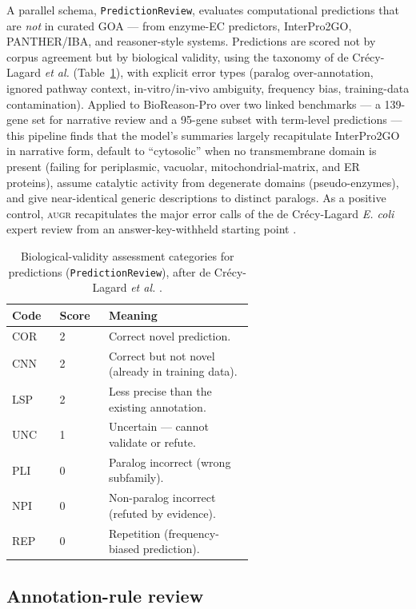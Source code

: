 \documentclass[11pt]{article}
\newcommand{\augr}{\textsc{augr}}
\newcommand{\code}[1]{\texttt{#1}}
\begin{document}
A parallel schema, \code{PredictionReview}, evaluates computational predictions
that are \emph{not} in curated GOA --- from enzyme-EC predictors, InterPro2GO,
PANTHER/IBA, and reasoner-style systems. Predictions are scored not by corpus
agreement but by biological validity, using the taxonomy of de Cr\'ecy-Lagard
\emph{et al.} \cite{decrecylagard2025} (Table~\ref{tab:pred}), with explicit error
types (paralog over-annotation, ignored pathway context, in-vitro/in-vivo
ambiguity, frequency bias, training-data contamination). Applied to BioReason-Pro
\cite{fallahpour2026} over two linked benchmarks --- a 139-gene set for narrative
review and a 95-gene subset with term-level predictions --- this pipeline finds
that the model's summaries largely recapitulate InterPro2GO in narrative form,
default to ``cytosolic'' when no transmembrane domain is present (failing for
periplasmic, vacuolar, mitochondrial-matrix, and ER proteins), assume catalytic
activity from degenerate domains (pseudo-enzymes), and give near-identical generic
descriptions to distinct paralogs. As a positive control, \augr{} recapitulates
the major error calls of the de Cr\'ecy-Lagard \emph{E. coli} expert review from
an answer-key-withheld starting point \cite{mungall2026esrecolidetmini}.

\begin{table}[htbp]
\centering
\caption{Biological-validity assessment categories for predictions
(\code{PredictionReview}), after de Cr\'ecy-Lagard \emph{et al.}
\cite{decrecylagard2025}.}
\label{tab:pred}
\small
\begin{tabular}{@{}llp{0.60\linewidth}@{}}
\toprule
\textbf{Code} & \textbf{Score} & \textbf{Meaning} \\
\midrule
COR & 2 & Correct novel prediction. \\
CNN & 2 & Correct but not novel (already in training data). \\
LSP & 2 & Less precise than the existing annotation. \\
UNC & 1 & Uncertain --- cannot validate or refute. \\
PLI & 0 & Paralog incorrect (wrong subfamily). \\
NPI & 0 & Non-paralog incorrect (refuted by evidence). \\
REP & 0 & Repetition (frequency-biased prediction). \\
\bottomrule
\end{tabular}
\end{table}

\subsection{Annotation-rule review}
\end{document}
